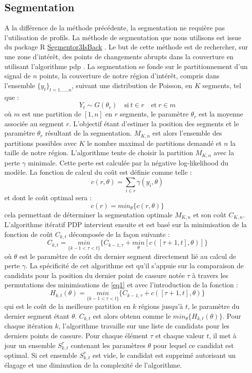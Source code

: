 \documentclass[12pt,a4paper]{report}
\begin{document}
\begin{onehalfspace}
\section*{Segmentation}
\label{methode_segmentation}

A la différence de la méthode précédente, la segmentation ne requière pas l'utilisation de profils. La méthode de segmentation que nous utilisons est issue du package R \href{http://cran.r-project.org/web/packages/Segmentor3IsBack/index.html}{Segmentor3IsBack} \citep{Cleynen2014}. Le but de cette méthode est de rechercher, sur une zone d'intérêt, des points de changements abrupts dans la couverture en utilisant l'algorithme \gls{pdp} \citep{Rigaill2010}. La segmentation se fonde sur le partitionnement d'un signal de $n$ points, la couverture de notre région d'intérêt, compris dans l'ensemble ${\{y_t\}_{t=1,\ldots,n}}$, suivant une distribution de Poisson, en $K$ segments, tel que :
\[ Y_t \sim G(\theta_r) \quad \text{si}\ t \in r \quad \text{et}\ r \in m \]
où $m$ est une partition de $[1,n]$ en $r$ segments, le paramètre $\theta_r$ est la moyenne associée au segment $r$. L'objectif étant d'estimer la position des segments et le paramètre $\theta_r$ résultant de la segmentation. $M_{K,n}$ est alors l'ensemble des partitions possibles avec $K$ le nombre maximal de partitions demandé et $n$ la taille de notre région. L'algorithme tente de choisir la partition $M_{K,n}$ avec la perte $\gamma$ minimale. Cette perte est calculée par la négative log-likelihood du modèle. La fonction de calcul du coût est définie comme telle :
\[ c(r,\theta) = \sum_{i \in r} \gamma(y_i,\theta) \]
et dont le coût optimal sera :
\[ c(r) = min_\theta\{c(r,\theta)\} \]
cela permettant de déterminer la segmentation optimale $M_{K,n}$ et son coût $C_{K,n}$. L'algorithme itératif PDP intervient ensuite et est basé sur la minimisation de la fonction de coût $C_{k,t}$ décomposée de la façon suivante :
\begin{equation}
\label{eq1}
C_{k,t} = \underset{\{k-1<\tau<t\}}{min} \{C_{k-1,\tau} + \underset{\theta}{min}[c([\tau + 1,t],\theta)]\}
\end{equation}
où $\theta$ est le paramètre de coût du dernier segment directement lié au calcul de perte $\gamma$. La spécificité de cet algorithme est qu'il s'appuie sur la comparaison de candidats pour la position du dernier point de cassure notée $\tau$ à travers les permutations des minimisations de \eqref{eq1} et avec l'introduction de la fonction :
\[ H_{k,t}(\theta) = \underset{\{k-1<\tau<t\}}{min} \{C_{k-1,\tau} + c([\tau + 1,t],\theta)\} \]
qui est le coût de la meilleure partition en $k$ régions jusqu'à $t$, le paramètre du dernier segment étant $\theta$. $C_{k,t}$ est alors obtenu comme le $min_\theta\{H_{k,t}(\theta)\}$.
Pour chaque itération $k$, l'algorithme travaille sur une liste de candidats pour les derniers points de cassure. Pour chaque élément $\tau$ et chaque valeur $t$, il met à jour un ensemble $S_{k,t}^\tau$ contenant les paramètres $\theta$ pour lequel ce candidat est optimal. Si cet ensemble $S_{k,t}^\tau$ est vide, le candidat est supprimé autorisant un élagage et une diminution de la complexité de l'algorithme.


\end{onehalfspace}
\end{document}

